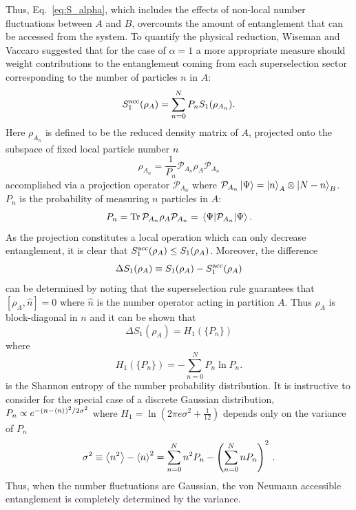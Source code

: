 Thus, Eq.~\eqref{eq:S_alpha}, which includes the effects of non-local number fluctuations between $A$ and $B$, overcounts the amount of entanglement that can be accessed from the system.  To quantify the physical reduction, Wiseman and Vaccaro \cite{Wiseman:2003jx} suggested that for the case of $\alpha = 1$ a more appropriate measure should weight contributions to the entanglement coming from each superselection sector corresponding to the number of particles $n$ in $A$:
%
\begin{equation}
    S_1^{\rm{acc}}(\rho_A)=\sum_{n=0}^{N} P_n S_1(\rho_{A_n})
\label{eq:S1acc}.
\end{equation}
%
Here $\rho_{A_{n}}$ is defined to be the reduced density matrix of $A$, projected onto the subspace of fixed local particle number $n$ 
%
\begin{equation}
    \rho_{A_n} = \frac{1}{P_n}{\mathcal{P}}_{A_n} \rho_{A} {\mathcal{P}}_{A_n}
\label{eq:rhoAn}
\end{equation}
%
accomplished via a projection operator ${\mathcal{P}}_{A_n}$ where
${\mathcal{P}}_{A_n} \ket{\Psi} = \ket{n}_A\otimes\ket{N-n}_{B}$.  
$P_n$ is the probability of measuring $n$ particles in $A$:
%
\begin{equation}
    P_n = \mathrm{Tr}\, {\mathcal{P}}_{A_n} \rho_A{\mathcal{P}}_{A_n}
    = \expval{{\mathcal{P}}_{A_n}}{\Psi}.
    \label{eq:Pn}
\end{equation}
%
As the projection constitutes a local operation which can only decrease
entanglement,  it is clear that $S_1^{\rm acc}(\rho_A) \le S_1(\rho_A)$. 
Moreover, the difference 
%
\begin{equation}
    \Delta S_1 (\rho_A) \equiv S_1(\rho_A) - S_1^{\rm acc}(\rho_A)
    \label{eq:DeltaS1}
\end{equation}
%
can be determined  by noting that the superselection rule guarantees that $[\rho_A,\hat{n}]=0$ where $\hat{n}$ is the number operator acting in partition $A$. Thus $\rho_A$ is block-diagonal in $n$ and it can be shown \cite{Klich:2008se} that 
%
\begin{equation}
    \Delta S_1 (\rho_A) =  H_1(\{P_n\})
\label{eq:DS1H1}
\end{equation}
%
where
%
\begin{equation}
    H_1(\{P_n\}) = -\sum_{n=0}^N P_n \ln P_n.
\label{eq:H1}
\end{equation}
%
is the Shannon entropy of the number probability distribution.  It is instructive to consider  for the special case of a discrete Gaussian distribution, $P_n \propto e^{-(n-\expval{n})^2/2\sigma^2}$ where $H_1 = \ln\left(2\pi e \sigma^2 + \tfrac{1}{12}\right)$ depends only on the variance of $P_n$
%
\begin{equation}
    \sigma^2 \equiv \expval{n^2}-\expval{n}^2 = \sum_{n=0}^N n^2 P_n  - \left(\sum_{n=0}^N n P_n\right)^2\,.
\label{eq:sigma2}
\end{equation}
%
Thus, when the number fluctuations are Gaussian, the von Neumann accessible entanglement is completely determined by the variance.

